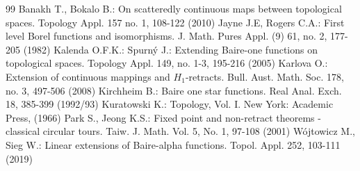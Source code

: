 \documentclass{amsart}
\theoremstyle{definition}
\begin{document}
\begin{thebibliography}{99}
 Banakh T., Bokalo B.: On scatteredly continuous maps between topological spaces. Topology Appl. 157 no. 1, 108-122 (2010)
 Jayne J.E, Rogers C.A.: First level Borel functions and isomorphisms. J. Math. Pures Appl. (9) 61, no. 2, 177-205 (1982)
 Kalenda O.F.K.: Spurn\'y J.: Extending Baire-one functions on topological spaces. Topology Appl. 149, no. 1-3, 195-216 (2005)
 Karlova O.: Extension of continuous mappings and $H_1$-retracts. Bull. Aust. Math. Soc. 178, no. 3, 497-506 (2008)
 Kirchheim B.: Baire one star functions. Real Anal. Exch. 18, 385-399 (1992/93)
 Kuratowski K.: Topology, Vol. I. New York: Academic Press, (1966)
 Park S., Jeong K.S.: Fixed point and non-retract theorems - classical circular tours. Taiw. J. Math. Vol. 5,  No. 1, 97-108 (2001)
 Wójtowicz M., Sieg W.: Linear extensions of Baire-alpha functions. Topol. Appl. 252, 103-111 (2019)
\end{thebibliography}
\end{document}
